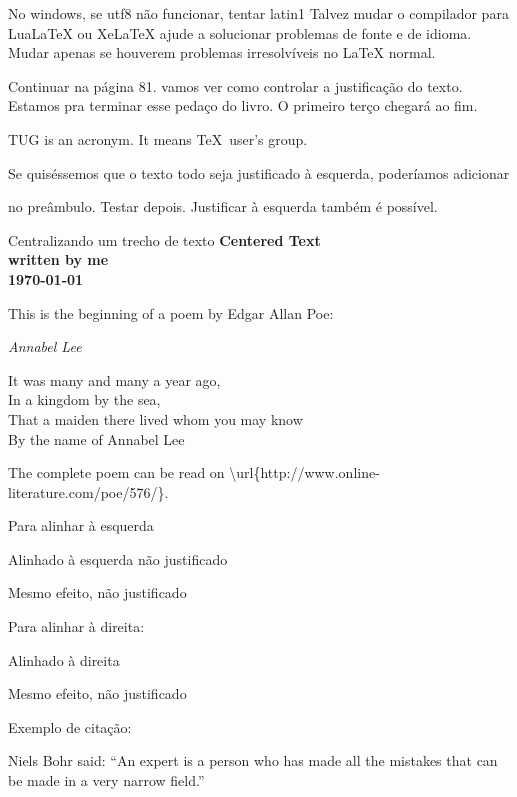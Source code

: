 \documentclass{article}
\begin{document}
No windows, se utf8 não funcionar, tentar latin1
Talvez mudar o compilador para LuaLaTeX ou XeLaTeX ajude a solucionar
problemas de fonte e de idioma.
Mudar apenas se houverem problemas irresolvíveis no LaTeX normal.

Continuar na página 81. vamos ver como controlar a justificação do texto.
Estamos pra terminar esse pedaço do livro. O primeiro terço chegará ao fim.

\parbox{3cm}{\raggedright
    TUG is an acronym. It means \TeX\ user's group.
}
Se quiséssemos que o texto todo seja justificado à esquerda, poderíamos
adicionar \raggedright no preâmbulo. 
Testar depois.
Justificar à esquerda também é possível.

Centralizando um trecho de texto
{\centering
\huge\bfseries Centered Text \\
\Large \normalfont written by me \\
\normalsize \today \\
}


\noindent This is the beginning of a poem
by Edgar Allan Poe:
\begin{center}
    \emph{Annabel Lee}
\end{center}
\begin{center}
    It was many and many a year ago,\\
    In a kingdom by the sea,\\
    That a maiden there lived whom you may know\\
    By the name of Annabel Lee
\end{center}

The complete poem can be read on
\textbackslash url\{http://www.online-literature.com/poe/576/\}.

Para alinhar à esquerda
\begin{flushleft}
Alinhado à esquerda não justificado
\end{flushleft}
{\raggedright
Mesmo efeito, não justificado
}

Para alinhar à direita:
\begin{flushright}
    Alinhado à direita
\end{flushright}
{\raggedleft
Mesmo efeito, não justificado
}

Exemplo de citação:

Niels Bohr said: ``An expert is a person who has made
all the mistakes that can be made in a very narrow field.''
\end{document}
